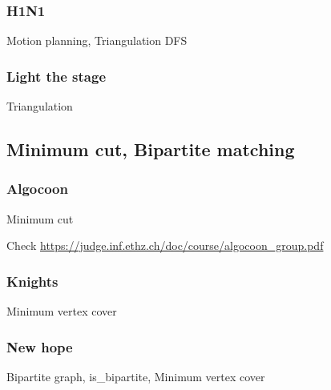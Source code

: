 \documentclass[10pt,a4paper,landscape,twocolumn,twoside]{article}
\begin{document}
		\subsubsection{H1N1}
		\label{subs:H1N1}
		\begin{keywords}Motion planning, Triangulation DFS\end{keywords}
		

		\subsubsection{Light the stage}
		\label{subs:Light the stage}
		\begin{keywords}Triangulation\end{keywords}
		

	\newpage
	\subsection{Minimum cut, Bipartite matching}
	\label{sub:Minimum cut, Bipartite matching}

		\subsubsection{Algocoon}
		\label{subs:Algocoon}
		\begin{keywords}Minimum cut\end{keywords}

		Check \url{https://judge.inf.ethz.ch/doc/course/algocoon_group.pdf}
		

		\subsubsection{Knights}
		\label{subs:Knights}
		\begin{keywords}Minimum vertex cover\end{keywords}
		

		\subsubsection{New hope}
		\label{subs:New hope}
		\begin{keywords}Bipartite graph, is\_bipartite, Minimum vertex cover\end{keywords}
\end{document}
